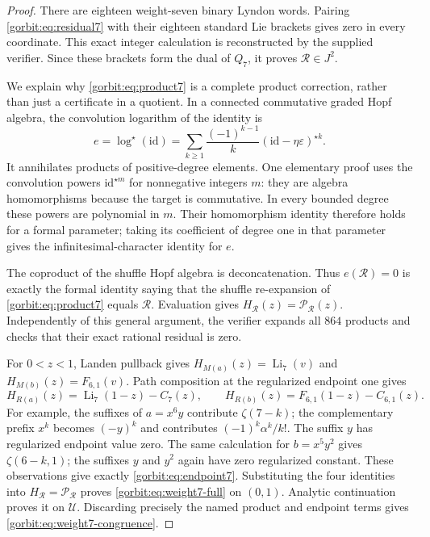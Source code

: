 \begin{proof}
There are eighteen weight-seven binary Lyndon words. Pairing
\eqref{gorbit:eq:residual7} with their eighteen standard Lie brackets
gives zero in every coordinate. This exact integer calculation is
reconstructed by the supplied verifier. Since these brackets form the
dual of $Q_7$, it proves $\mathcal R\in J^2$.

We explain why \eqref{gorbit:eq:product7} is a complete product
correction, rather than just a certificate in a quotient. In a connected
commutative graded Hopf algebra, the convolution logarithm of the
identity is
\[
 e=\log^\star(\mathrm{id})
   =\sum_{k\ge1}\frac{(-1)^{k-1}}k
                       (\mathrm{id}-\eta\varepsilon)^{\star k}.
\]
It annihilates products of positive-degree elements. One elementary
proof uses the convolution powers $\mathrm{id}^{\star m}$ for
nonnegative integers $m$: they are algebra homomorphisms because the
target is commutative. In every bounded degree these powers are
polynomial in $m$. Their homomorphism identity therefore holds for a
formal parameter; taking its coefficient of degree one in that
parameter gives the infinitesimal-character identity for $e$.

The coproduct of the shuffle Hopf algebra is deconcatenation. Thus
$e(\mathcal R)=0$ is exactly the formal identity saying that the
shuffle re-expansion of \eqref{gorbit:eq:product7} equals
$\mathcal R$. Evaluation gives
$H_{\mathcal R}(z)=\mathcal P_{\mathcal R}(z)$. Independently of
this general argument, the verifier expands all $864$ products and
checks that their exact rational residual is zero.

For $0<z<1$, Landen pullback gives
$H_{M(a)}(z)=\operatorname{Li}_7(v)$ and
$H_{M(b)}(z)=F_{6,1}(v)$. Path composition at the regularized endpoint
one gives
\[
 H_{R(a)}(z)=\operatorname{Li}_7(1-z)-C_7(z),\qquad
 H_{R(b)}(z)=F_{6,1}(1-z)-C_{6,1}(z).
\]
For example, the suffixes of $a=x^6y$ contribute $\zeta(7-k)$;
the complementary prefix $x^k$ becomes $(-y)^k$ and contributes
$(-1)^k\alpha^k/k!$. The suffix $y$ has regularized endpoint value
zero. The same calculation for $b=x^5y^2$ gives $\zeta(6-k,1)$;
the suffixes $y$ and $y^2$ again have zero regularized constant.
These observations give exactly \eqref{gorbit:eq:endpoint7}.
Substituting the four identities into $H_{\mathcal R}=\mathcal P_{
\mathcal R}$ proves \eqref{gorbit:eq:weight7-full} on $(0,1)$.
Analytic continuation proves it on $\mathcal U$. Discarding precisely
the named product and endpoint terms gives
\eqref{gorbit:eq:weight7-congruence}.
\end{proof}

